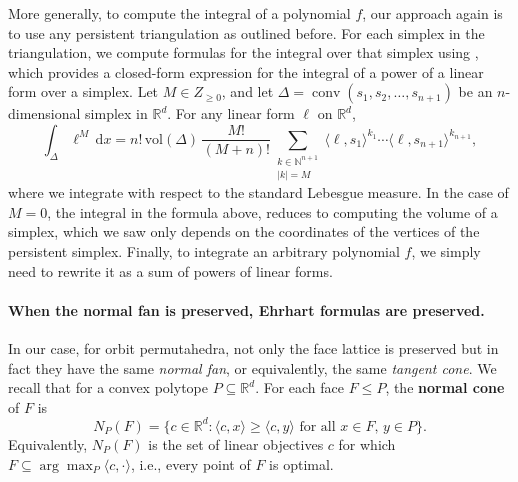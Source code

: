 \documentclass{amsart}
\theoremstyle{definition}
\DeclareMathOperator{\conv}{conv}
\begin{document}
More generally, to compute the integral of a polynomial $f$, our approach again is to use any  persistent triangulation as outlined before.
For each simplex in the triangulation, we compute formulas for the integral over that simplex using \cite[Lemma 8]{BBDeLKV11}, which provides a closed-form expression for the integral of a power of a linear form over a simplex. Let $M \in Z_{\geq 0}$, and let $\Delta = \conv(s_1, s_2,\dots, s_{n+1})$ be an $n$-dimensional simplex in $\mathbb{R}^d$. For any linear form $\ell$ on $\mathbb{R}^d$,
\begin{equation}
\int_{\Delta} \ell^M \, \mathrm{d}x
  = n!\,\mathrm{vol}(\Delta)\,
    \frac{M!}{(M+n)!}
    \sum_{\substack{k \in \mathbb{N}^{n+1}\\ |k|=M}}
    \langle \ell, s_1 \rangle^{k_1}
    \cdots
    \langle \ell, s_{n+1} \rangle^{k_{n+1}},
\label{eqn:moment}
\end{equation}
where we integrate with respect to the standard Lebesgue measure.
In the case of $M=0$, the integral in the formula above, reduces to computing the volume of a simplex, which we saw only depends on the coordinates of the vertices of the persistent simplex. Finally, to integrate an arbitrary polynomial $f$, we simply need to rewrite it as a sum of powers of linear forms.

\paragraph{\bf When the normal fan is preserved, Ehrhart formulas are preserved.}
In our case, for orbit permutahedra, not only the face lattice is preserved but in fact they have the same \emph{normal fan}, or equivalently, the same \emph{tangent cone}. We recall that for a convex polytope $P \subseteq \mathbb{R}^d$. For each face $F \leq P$, the \textbf{normal cone} of $F$ is
\[
N_P(F) = \{ c \in \mathbb{R}^d : \langle c, x \rangle \geq \langle c, y \rangle \text{ for all } x \in F,\, y \in P \}.
\]
Equivalently, $N_P(F)$ is the set of linear objectives $c$ for which
$F \subseteq \arg\max_{P} \langle c, \cdot \rangle$, i.e., every point of $F$ is optimal.
\end{document}
